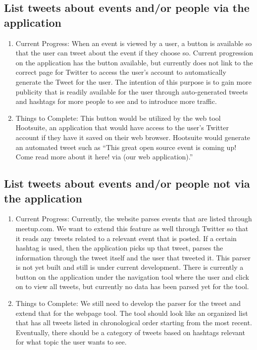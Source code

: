 \documentclass[letterpaper,10pt,onecolumn]{IEEEtran} %
\begin{document}
\subsection{List tweets about events and/or people via the application}
\begin{enumerate}[label*=\arabic*.]
\item Current Progress: When an event is viewed by a user, a button is available so that the user can tweet about the event if they choose so. Current progression on the application has the button available, but currently does not link to the correct page for Twitter to access the user’s account to automatically generate the Tweet for the user. The intention of this purpose is to gain more publicity that is readily available for the user through auto-generated tweets and hashtags for more people to see and to introduce more traffic.

\item Things to Complete: This button would be utilized by the web tool Hootsuite, an application that would have access to the user’s Twitter account if they have it saved on their web browser. Hootsuite would generate an automated tweet such as “This great open source event is coming up! Come read more about it here! via (our web application).”
\end{enumerate}

\subsection{List tweets about events and/or people not via the application}
\begin{enumerate}[label*=\arabic*.]
\item Current Progress: Currently, the website parses events that are listed through meetup.com. We want to extend this feature as well through Twitter so that it reads any tweets related to a relevant event that is posted. If a certain hashtag is used, then the application picks up that tweet, parses the information through the tweet itself and the user that tweeted it. This parser is not yet built and still is under current development. There is currently a button on the application under the navigation tool where the user and click on to view all tweets, but currently no data has been parsed yet for the tool.

\item Things to Complete: We still need to develop the parser for the tweet and extend that for the webpage tool. The tool should look like an organized list that has all tweets listed in chronological order starting from the most recent. Eventually, there should be a category of tweets based on hashtags relevant for what topic the user wants to see.
\end{enumerate}
\end{document}
